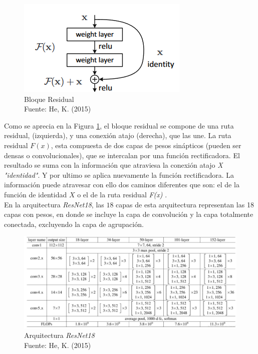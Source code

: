\newpage
\begin{figure}[ht]
	\centering
	\includegraphics[scale=0.7]{Figs/67.png}
	\caption{Bloque Residual \\ Fuente: He, K. (2015) }
	\label{fig:Bloque}
\end{figure}

Como se aprecia en la Figura \ref{fig:Bloque}, el bloque residual se compone de una ruta residual, (izquierda), y una conexión atajo (derecha), que las une. La ruta residual $F(x)$, esta compuesta de dos capas de pesos sinápticos (pueden ser densas o convolucionales), que se intercalan por una función rectificadora. El resultado se suma con la información que atraviesa la conexión atajo \textit{X "identidad"}. Y por ultimo se aplica nuevamente la función rectificadora. La información puede atravesar con ello dos caminos diferentes que son: el de la función de identidad $X$ o el de la ruta residual \textit{F(x)} \cite{ref_5}.\\

En la arquitectura \textit{ResNet18}, las $18$ capas de esta arquitectura representan las 18 capas con pesos, en donde se incluye la capa de convolución y la capa totalmente conectada, excluyendo la capa de agrupación.

\begin{figure}[ht]
	\centering
	\includegraphics[scale=0.65]{Figs/68.png}
	\caption{Arquitectura \textit{ResNet18} \\ Fuente: He, K. (2015)}
	\label{fig:ArqRes18}
\end{figure}

